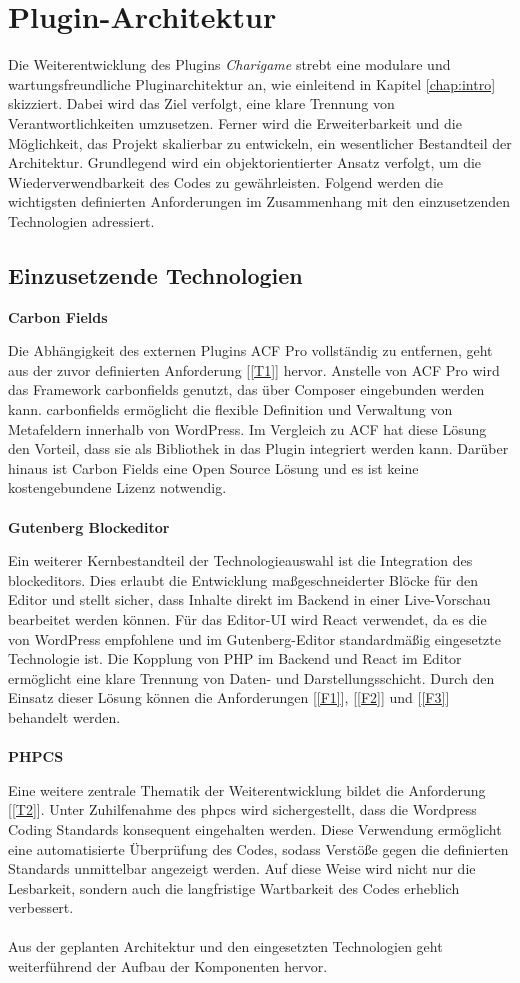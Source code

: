 \section{Plugin-Architektur}
Die Weiterentwicklung des Plugins \emph{Charigame} strebt eine modulare und wartungsfreundliche Pluginarchitektur an, wie einleitend in Kapitel \ref{chap:intro} skizziert.
Dabei wird das Ziel verfolgt, eine klare Trennung von Verantwortlichkeiten umzusetzen.
Ferner wird die Erweiterbarkeit und die Möglichkeit, das Projekt skalierbar zu entwickeln, ein wesentlicher Bestandteil der Architektur.
Grundlegend wird ein objektorientierter Ansatz verfolgt, um die Wiederverwendbarkeit des Codes zu gewährleisten.
Folgend werden die wichtigsten definierten Anforderungen im Zusammenhang mit den einzusetzenden Technologien adressiert.
\subsection{Einzusetzende Technologien}
\textbf{Carbon Fields}

Die Abhängigkeit des externen Plugins ACF Pro vollständig zu entfernen, geht aus der zuvor definierten Anforderung [\ref{T1}] hervor.
Anstelle von ACF Pro wird das Framework \gls{carbonfields} genutzt, das über Composer eingebunden werden kann.
\gls{carbonfields} ermöglicht die flexible Definition und Verwaltung von Metafeldern innerhalb von WordPress.
Im Vergleich zu ACF hat diese Lösung den Vorteil, dass sie als Bibliothek in das Plugin integriert werden kann.
Darüber hinaus ist Carbon Fields eine Open Source Lösung und es ist keine kostengebundene Lizenz notwendig.
\\\\
\textbf{Gutenberg Blockeditor}

Ein weiterer Kernbestandteil der Technologieauswahl ist die Integration des \gls{blockeditor}s.
Dies erlaubt die Entwicklung maßgeschneiderter Blöcke für den Editor und stellt sicher, dass Inhalte direkt im Backend in einer Live-Vorschau bearbeitet werden können.
Für das Editor-UI wird React verwendet, da es die von WordPress empfohlene und im Gutenberg-Editor standardmäßig eingesetzte Technologie ist.
Die Kopplung von PHP im Backend und React im Editor ermöglicht eine klare Trennung von Daten- und Darstellungsschicht.
Durch den Einsatz dieser Lösung können die Anforderungen [\ref{F1}], [\ref{F2}] und [\ref{F3}] behandelt werden.
\\\\
\textbf{PHPCS}

Eine weitere zentrale Thematik der Weiterentwicklung bildet die Anforderung [\ref{T2}].
Unter Zuhilfenahme des \gls{phpcs} wird sichergestellt, dass die Wordpress Coding Standards konsequent eingehalten werden.
Diese Verwendung ermöglicht eine automatisierte Überprüfung des Codes, sodass Verstöße gegen die definierten Standards unmittelbar angezeigt werden.
Auf diese Weise wird nicht nur die Lesbarkeit, sondern auch die langfristige Wartbarkeit des Codes erheblich verbessert.
\\\\
Aus der geplanten Architektur und den eingesetzten Technologien geht weiterführend der Aufbau der Komponenten hervor.


